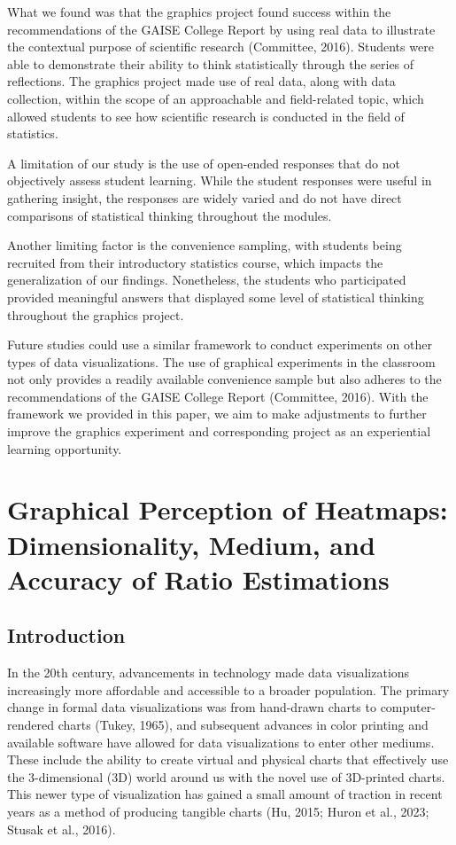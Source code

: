 \documentclass[phd]{nuthesis}
\begin{document}
What we found was that the graphics project found success within the
recommendations of the GAISE College Report by using real data to
illustrate the contextual purpose of scientific research (Committee,
2016). Students were able to demonstrate their ability to think
statistically through the series of reflections. The graphics project
made use of real data, along with data collection, within the scope of
an approachable and field-related topic, which allowed students to see
how scientific research is conducted in the field of statistics.

A limitation of our study is the use of open-ended responses that do not
objectively assess student learning. While the student responses were
useful in gathering insight, the responses are widely varied and do not
have direct comparisons of statistical thinking throughout the modules.

Another limiting factor is the convenience sampling, with students being
recruited from their introductory statistics course, which impacts the
generalization of our findings. Nonetheless, the students who
participated provided meaningful answers that displayed some level of
statistical thinking throughout the graphics project.

Future studies could use a similar framework to conduct experiments on
other types of data visualizations. The use of graphical experiments in
the classroom not only provides a readily available convenience sample
but also adheres to the recommendations of the GAISE College Report
(Committee, 2016). With the framework we provided in this paper, we aim
to make adjustments to further improve the graphics experiment and
corresponding project as an experiential learning opportunity.


\chapter{Graphical Perception of Heatmaps: Dimensionality, Medium, and
Accuracy of Ratio
Estimations}\label{graphical-perception-of-heatmaps-dimensionality-medium-and-accuracy-of-ratio-estimations}

\section{Introduction}\label{introduction-2}

In the 20th century, advancements in technology made data visualizations
increasingly more affordable and accessible to a broader population. The
primary change in formal data visualizations was from hand-drawn charts
to computer-rendered charts (Tukey, 1965), and subsequent advances in
color printing and available software have allowed for data
visualizations to enter other mediums. These include the ability to
create virtual and physical charts that effectively use the
3-dimensional (3D) world around us with the novel use of 3D-printed
charts. This newer type of visualization has gained a small amount of
traction in recent years as a method of producing tangible charts (Hu,
2015; Huron et al., 2023; Stusak et al., 2016).
\end{document}
